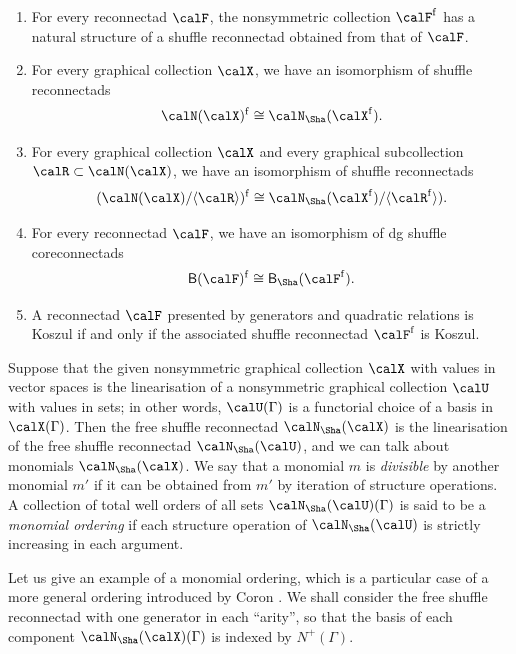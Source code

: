 \begin{coro}\label{cor:forget}\leavevmode
\begin{enumerate}
\item For every reconnectad $\calF$, the nonsymmetric collection $\calF^{\mathrm{f}}$ has a natural structure of a shuffle reconnectad obtained from that of $\calF$.
\item For every graphical collection $\calX$, we have an isomorphism of shuffle reconnectads
 \[
\calN(\calX)^{\mathrm{f}}\cong\calN_{\Sha}(\calX^{\mathrm{f}}). 
 \]
\item For every graphical collection $\calX$ and every graphical subcollection $\calR\subset\calN(\calX)$, we have an isomorphism of shuffle reconnectads
 \[
(\calN(\calX)/\langle\calR\rangle)^{\mathrm{f}}\cong \calN_{\Sha}(\calX^{\mathrm{f}})/\langle\calR^{\mathrm{f}}\rangle).
 \]
\item For every reconnectad $\calF$, we have an isomorphism of dg shuffle coreconnectads
 \[
\mathsf{B}(\calF)^{\mathrm{f}}\cong\mathsf{B}_{\Sha}(\calF^{\mathrm{f}}).
 \] 
\item A reconnectad $\calF$ presented by generators and quadratic relations is Koszul if and only if the associated shuffle reconnectad $\calF^{\mathrm{f}}$ is Koszul.
\end{enumerate}
\end{coro}

Suppose that the given nonsymmetric graphical collection $\calX$ with values in vector spaces is the linearisation of a nonsymmetric graphical collection $\calU$ with values in sets; in other words, $\calU(\Gamma)$ is a functorial choice of a basis in $\calX(\Gamma)$. Then the free shuffle reconnectad $\calN_{\Sha}(\calX)$ is the linearisation of the free shuffle reconnectad $\calN_{\Sha}(\calU)$, and we can talk about monomials $\calN_{\Sha}(\calX)$. We say that a monomial $m$ is \emph{divisible} by another monomial $m'$ if it can be obtained from $m'$ by iteration of structure operations. A collection of total well orders of all sets $\calN_{\Sha}(\calU)(\Gamma)$ is said to be a \emph{monomial ordering} if each structure operation of $\calN_{\Sha}(\calU)$ is strictly increasing in each argument. 

Let us give an example of a monomial ordering, which is a particular case of a more general ordering introduced by Coron \cite{CoronLattices}. We shall consider the free shuffle reconnectad with one generator in each ``arity'', so that the basis of each component $\calN_{\Sha}(\calX)(\Gamma)$ is indexed by $N^+(\Gamma)$. 

